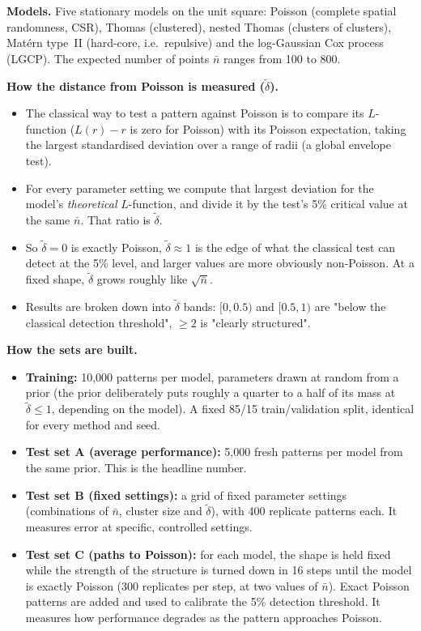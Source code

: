 \documentclass[10pt,a4paper]{article}
\newcommand{\nbar}{\bar n}
\newcommand{\dtil}{\tilde\delta}
\begin{document}
\textbf{Models.} Five stationary models on the unit square: Poisson (complete spatial randomness, CSR), Thomas (clustered), nested Thomas (clusters of clusters), Mat\'ern type~II (hard-core, i.e.\ repulsive) and the log-Gaussian Cox process (LGCP). The expected number of points $\nbar$ ranges from 100 to 800.

\textbf{How the distance from Poisson is measured ($\dtil$).}
\begin{itemize}
  \item The classical way to test a pattern against Poisson is to compare its $L$-function ($L(r)-r$ is zero for Poisson) with its Poisson expectation, taking the largest standardised deviation over a range of radii (a global envelope test).
  \item For every parameter setting we compute that largest deviation for the model's \emph{theoretical} $L$-function, and divide it by the test's 5\% critical value at the same $\nbar$. That ratio is $\dtil$.
  \item So $\dtil = 0$ is exactly Poisson, $\dtil \approx 1$ is the edge of what the classical test can detect at the 5\% level, and larger values are more obviously non-Poisson. At a fixed shape, $\dtil$ grows roughly like $\sqrt{\nbar}$.
  \item Results are broken down into $\dtil$ bands: $[0,0.5)$ and $[0.5,1)$ are "below the classical detection threshold", $\ge 2$ is "clearly structured".
\end{itemize}

\textbf{How the sets are built.}
\begin{itemize}
  \item \textbf{Training:} 10{,}000 patterns per model, parameters drawn at random from a prior (the prior deliberately puts roughly a quarter to a half of its mass at $\dtil \le 1$, depending on the model). A fixed 85/15 train/validation split, identical for every method and seed.
  \item \textbf{Test set A (average performance):} 5{,}000 fresh patterns per model from the same prior. This is the headline number.
  \item \textbf{Test set B (fixed settings):} a grid of fixed parameter settings (combinations of $\nbar$, cluster size and $\dtil$), with 400 replicate patterns each. It measures error at specific, controlled settings.
  \item \textbf{Test set C (paths to Poisson):} for each model, the shape is held fixed while the strength of the structure is turned down in 16 steps until the model is exactly Poisson (300 replicates per step, at two values of $\nbar$). Exact Poisson patterns are added and used to calibrate the 5\% detection threshold. It measures how performance degrades as the pattern approaches Poisson.
\end{itemize}
\end{document}
